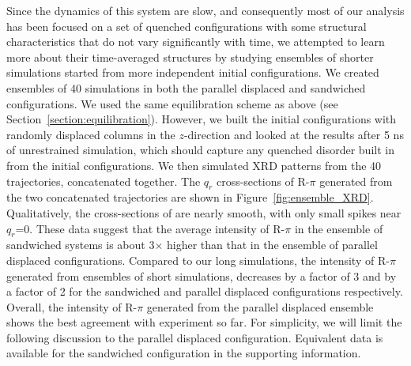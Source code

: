 \documentclass[journal=jpcbfk,manuscript=article]{achemso}
\begin{document}
  Since the dynamics of this system are slow, and consequently most
  of our analysis has been focused on a set of quenched configurations
  with some structural characteristics that do not vary significantly
  with time, we attempted to learn more about their time-averaged 
  structures by studying ensembles of shorter simulations started
  from more independent initial configurations. We created ensembles
  of 40 simulations in both the parallel displaced and sandwiched 
  configurations. We used the same equilibration scheme as above 
  (see Section~\ref{section:equilibration}). However, we built the 
  initial configurations with randomly displaced columns in the 
  $z$-direction and looked at the results after 5 ns of unrestrained
  simulation, which should capture any quenched disorder built in 
  from the initial configurations. We then simulated XRD patterns 
  from the 40 trajectories, concatenated together. The $q_r$ 
  cross-sections of R-$\pi$ generated from the two concatenated 
  trajectories are shown in Figure~\ref{fig:ensemble_XRD}. 
  Qualitatively, the cross-sections of are nearly smooth, with only
  small spikes near $q_r$=0. These data suggest that the average 
  intensity of R-$\pi$ in the ensemble of sandwiched systems is 
  about 3$\times$ higher than that in the ensemble of parallel displaced
  configurations. Compared to our long simulations, the intensity of R-$\pi$
  generated from ensembles of short simulations, decreases by a factor of 3
  and by a factor of 2 for the sandwiched and parallel displaced configurations respectively. 
  Overall, the intensity of R-$\pi$ generated from the parallel displaced 
  ensemble shows the best agreement with experiment so far. For simplicity, 
  we will limit the following discussion to the parallel displaced configuration.
  Equivalent data is available for the sandwiched configuration in the
  supporting information. %
\end{document}
